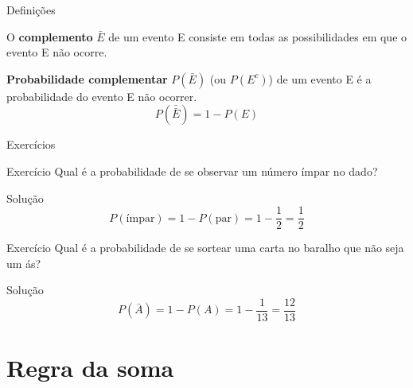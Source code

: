 \documentclass{beamer}
\begin{document}
\begin{frame}{Definições}
  \begin{definition}
    O {\bf complemento} $\bar{E}$ de um evento E consiste em todas as
    possibilidades em que o evento E \alert{não} ocorre.
  \end{definition}
  \begin{definition}
    {\bf Probabilidade complementar} $P(\bar{E})$ (ou $P(E^c)$) de um
    evento E é a probabilidade do evento E \alert{não} ocorrer.
    \begin{displaymath}
      P(\bar{\bar{E}}) = 1 - P(E)
    \end{displaymath}
  \end{definition}
\end{frame}

\begin{frame}{Exercícios}
  \begin{block}{Exercício}
    Qual é a probabilidade de se observar um número ímpar no dado?
  \end{block}
  \begin{block}{Solução}
    \begin{displaymath}
      P(\text{ímpar}) = 1-P(\text{par}) = 1-\frac{1}{2} = \frac{1}{2}
    \end{displaymath}
  \end{block}
  \begin{block}{Exercício}
    Qual é a probabilidade de se sortear uma carta no baralho que não
    seja um ás?
  \end{block}
  \begin{block}{Solução}
    \begin{displaymath}
      P(\bar{A})   = 1 - P(A) = 1- \frac{1}{13} = \frac{12}{13}
    \end{displaymath}
  \end{block}
\end{frame}

\section{Regra da soma}

\end{document}
